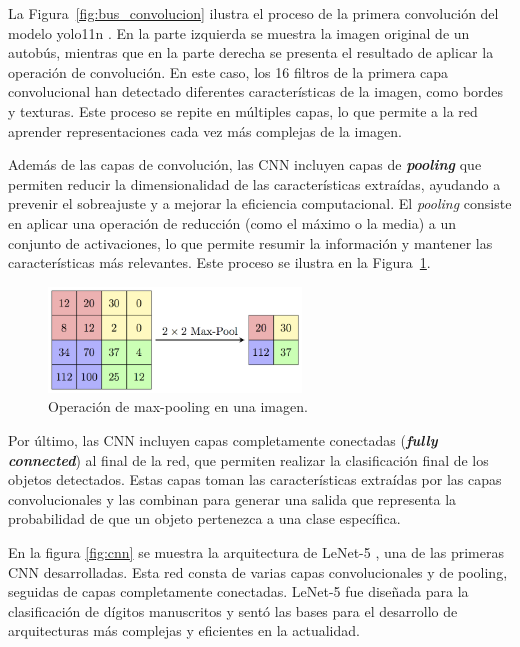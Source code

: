 \documentclass[11pt,spanish,listoffigures,listoftables]{tfgetsinf}
\begin{document}
La Figura~\ref{fig:bus_convolucion} ilustra el proceso de la primera convolución del modelo yolo11n \cite{yolo11_ultralytics}. En la parte izquierda se muestra la imagen original de un autobús, mientras que en la parte derecha se presenta el resultado de aplicar la operación de convolución. En este caso, los 16 filtros de la primera capa convolucional han detectado diferentes características de la imagen, como bordes y texturas. Este proceso se repite en múltiples capas, lo que permite a la red aprender representaciones cada vez más complejas de la imagen.

Además de las capas de convolución, las CNN incluyen capas de \textit{\textbf{pooling}} que permiten reducir la dimensionalidad de las características extraídas, ayudando a prevenir el sobreajuste y a mejorar la eficiencia computacional. El \textit{pooling} consiste en aplicar una operación de reducción (como el máximo o la media) a un conjunto de activaciones, lo que permite resumir la información y mantener las características más relevantes. Este proceso se ilustra en la Figura~\ref{fig:pooling}.

\begin{figure}[H]
   \centering
   \includegraphics[width=0.6\textwidth]{images/estado_del_arte/max_pooling.png}
   \caption{Operación de max-pooling en una imagen.}
   \label{fig:pooling}
\end{figure}

Por último, las CNN incluyen capas completamente conectadas (\textit{\textbf{fully connected}}) al final de la red, que permiten realizar la clasificación final de los objetos detectados. Estas capas toman las características extraídas por las capas convolucionales y las combinan para generar una salida que representa la probabilidad de que un objeto pertenezca a una clase específica.

En la figura \ref{fig:cnn} se muestra la arquitectura de LeNet-5 \cite{lecun1998gradient}, una de las primeras CNN desarrolladas. Esta red consta de varias capas convolucionales y de pooling, seguidas de capas completamente conectadas. LeNet-5 fue diseñada para la clasificación de dígitos manuscritos y sentó las bases para el desarrollo de arquitecturas más complejas y eficientes en la actualidad.
\end{document}

